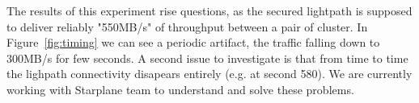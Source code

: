 The results of this experiment rise questions, as the secured
lightpath is supposed to deliver reliably "550MB/s" of throughput
between a pair of cluster. In Figure~\ref{fig:timing} we can see a
periodic artifact, the traffic falling down to 300MB/s for few
seconds. A second issue to investigate is that from time to time the
lighpath connectivity disapears entirely (e.g. at second 580). We are
currently working with Starplane team to understand and solve these
problems.


